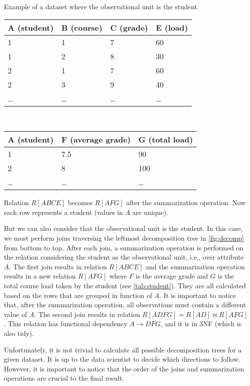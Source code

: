 \begin{tablebox}[label=tab:student]{Example of a dataset where the observational unit is the student.}
  \centering
  \begin{tabular}{llll}
    \toprule
    \textbf{A (student)} & \textbf{B (course)} & \textbf{C (grade)} & \textbf{E (load)} \\
    \midrule
    1 & 1 & 7 & 60 \\
    1 & 2 & 8 & 30 \\
    2 & 1 & 7 & 60 \\
    2 & 3 & 9 & 40 \\
    \dots & \dots & \dots & \dots \\
    \bottomrule
  \end{tabular}
  \\[1em]
  \begin{tabular}{lll}
    \toprule
    \textbf{A (student)} & \textbf{F (average grade)} & \textbf{G (total load)} \\
    \midrule
    1 & 7.5 & 90 \\
    2 & 8 & 100 \\
    \dots & \dots & \dots \\
    \bottomrule
  \end{tabular}
  \tcblower
  Relation $R[ABCE]$ becomes $R[AFG]$ after the summarization operation.  Now each row
  represents a student (values in $A$ are unique).
\end{tablebox}

But we can also consider that the observational unit is the student.  In this case, we
must perform joins traversing the leftmost decomposition tree in \cref{fig:decomp} from
bottom to top.  After each join, a summarization operation is performed on the relation
considering the student as the observational unit, i.e., over attribute $A$.  The first
join results in relation $R[ABCE]$ and the summarization operation results in a new
relation $R[AFG]$ where $F$ is the average grade and $G$ is the total course load taken by
the student (see \cref{tab:student}).  They are all calculated based on the rows that are grouped in function of $A$.
It is important to notice that, after the summarization operation, all observations must
contain a different value of $A$.  The second join results in relation $R[ADFG] = R[AD]
\bowtie R[AFG]$.  This relation has functional dependency $A \to DFG$, and it is in 3NF
(which is also tidy).

Unfortunately, it is not trivial to calculate all possible decomposition trees for a given
dataset.  It is up to the data scientist to decide which directions to follow.  However,
it is important to notice that the order of the joins and summarization operations are
crucial to the final result.

